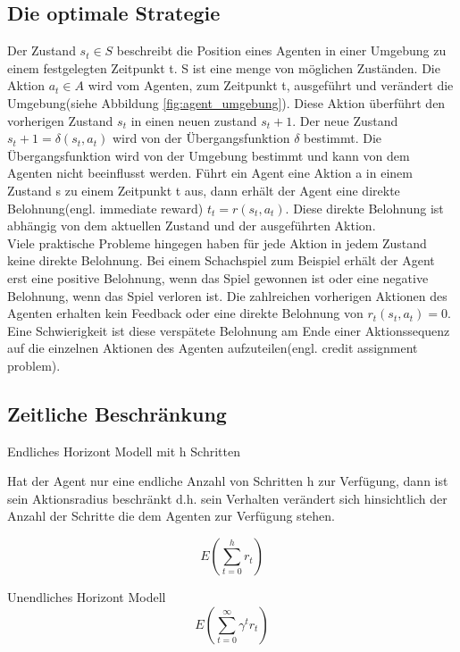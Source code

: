 \subsection{Die optimale Strategie}
Der Zustand $s_t \in S$ beschreibt die Position eines Agenten in einer Umgebung zu einem festgelegten Zeitpunkt t. S ist eine menge von möglichen Zuständen. Die Aktion $a_t \in A$ wird vom Agenten, zum Zeitpunkt t, ausgeführt und verändert die Umgebung(siehe Abbildung \ref{fig:agent_umgebung}). Diese Aktion überführt den vorherigen Zustand $s_t$ in einen neuen zustand $s_t+1$. Der neue Zustand $s_t+1 = \delta(s_t, a_t)$ wird von der Übergangsfunktion $\delta$ bestimmt. Die Übergangsfunktion wird von der Umgebung bestimmt und kann von dem Agenten nicht beeinflusst werden. Führt ein Agent eine Aktion a in einem Zustand s zu einem Zeitpunkt t aus, dann erhält der Agent eine direkte Belohnung(engl. immediate reward) $t_t = r(s_t, a_t)$. Diese direkte Belohnung ist abhängig von dem aktuellen Zustand und der ausgeführten Aktion.\\

Viele praktische Probleme hingegen haben für jede Aktion in jedem Zustand keine direkte Belohnung. Bei einem Schachspiel zum Beispiel erhält der Agent erst eine positive Belohnung, wenn das Spiel gewonnen ist oder eine negative Belohnung, wenn das Spiel verloren ist. Die zahlreichen vorherigen Aktionen des Agenten erhalten kein Feedback oder eine direkte Belohnung von $r_t(s_t, a_t) = 0$. Eine Schwierigkeit ist diese verspätete Belohnung am Ende einer Aktionssequenz auf die einzelnen Aktionen des Agenten aufzuteilen(engl. credit assignment problem).

\cite[290]{Ertel}   

\subsection{Zeitliche Beschränkung}
Endliches Horizont Modell mit h Schritten

Hat der Agent nur eine endliche Anzahl von Schritten h zur Verfügung, dann ist sein Aktionsradius beschränkt d.h. sein Verhalten verändert sich hinsichtlich der Anzahl der Schritte die dem Agenten zur Verfügung stehen. 

\begin{equation}
E(\sum_{t=0}^{h} r_t)
\end{equation}


Unendliches Horizont Modell
\begin{equation}
E(\sum_{t=0}^{\infty} \gamma^t r_t)
\end{equation}

